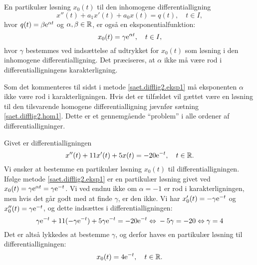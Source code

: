 \begin{method}[Eksponentialfunktion] \label{saet.difflig2.eksp1}
En partikulær løsning $ x_0(t) $ til den inhomogene differentialligning
\begin{equation}
x''(t) + a_1x'(t) + a_0x(t) = q(t), \quad t \in I,
\end{equation}
hvor $ q(t) = \beta \mathrm{e}^{\alpha t} $ og $ \alpha,\beta \in \mathbb{R} $, er også en eksponentialfunktion:
\begin{equation}
x_0(t) = \gamma \mathrm{e}^{\alpha t}, \quad t \in I,
\end{equation}
hvor $ \gamma $ bestemmes ved indsættelse af udtrykket for $ x_0(t) $ som løsning i den inhomogene differentialligning. Det præciseres, at $ \alpha $ ikke må være rod i differentialligningens karakterligning.
\end{method}

\begin{info}
Som det kommenteres til sidst i metode \ref{saet.difflig2.eksp1} må eksponenten $ \alpha $ ikke være rod i karakterligningen. Hvis det er tilfældet vil gættet være en løsning til den tilsvarende homogene differentialligning jævnfør sætning \ref{saet.difflig2.hom1}. Dette er et gennemgående ``problem'' i alle ordener af differentialligninger.
\end{info}

\begin{example}[Eksponentialfunktion] \label{eks.difflig2.eksp1}
Givet er differentialligningen
\begin{equation}
x''(t) + 11x'(t) + 5x(t) = -20\mathrm{e}^{-t}, \quad t \in \mathbb{R}.
\end{equation}
Vi ønsker at bestemme en partikulær løsning $ x_0(t) $ til differentialligningen. Ifølge metode \ref{saet.difflig2.eksp1} er en partikulær løsning givet ved $ x_0(t) = \gamma \mathrm{e}^{\alpha t} = \gamma \mathrm{e}^{- t} $. Vi ved endnu ikke om $ \alpha = -1 $ er rod i karakterligningen, men hvis det går godt med at finde $ \gamma $, er den ikke. Vi har $ x_0'(t) = -\gamma \mathrm{e}^{- t} $ og $ x_0''(t) = \gamma \mathrm{e}^{- t} $, og dette indsættes i differentialligningen:
\begin{equation}
\gamma \mathrm{e}^{- t} + 11(-\gamma \mathrm{e}^{- t}) + 5\gamma \mathrm{e}^{-t} = -20\mathrm{e}^{-t} \Leftrightarrow \\
-5 \gamma = -20 \Leftrightarrow \gamma = 4
\end{equation}
Det er altså lykkedes at bestemme $ \gamma $, og derfor haves en partikulær løsning til differentialligningen:
\begin{equation}
x_0(t) = 4\mathrm{e}^{-t}, \quad t \in \mathbb{R}.
\end{equation}
\end{example}

